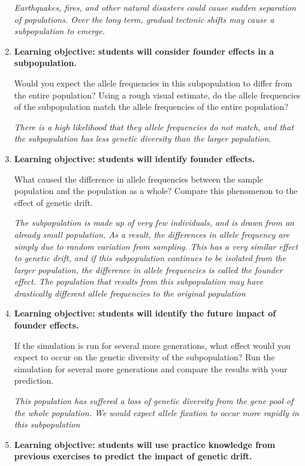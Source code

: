 \documentclass[12pt]{article}
\begin{document}
\begin{spacing}{1.5}
\begin{enumerate}
\par \textit{Earthquakes, fires, and other natural disasters could cause sudden separation of populations. Over the long term, gradual tectonic shifts may cause a subpopulation to emerge.}
\item
\par \textbf{Learning objective: students will consider founder effects in a subpopulation.}
\par Would you expect the allele frequencies in this subpopulation to differ from the entire population? Using a rough visual estimate, do the allele frequencies of the subpopulation match the allele frequencies of the entire population?
\par \textit{There is a high likelihood that they allele frequencies do not match, and that the subpopulation has less genetic diversity than the larger population.}
\item
\par \textbf{Learning objective: students will identify founder effects.}
\par What caused the difference in allele frequencies between the sample population and the population as a whole? Compare this phenomenon to the effect of genetic drift.
\par \textit{The subpopulation is made up of very few individuals, and is drawn from an already small population. As a result, the differences in allele frequency are simply due to random variation from sampling. This has a very similar effect to genetic drift, and if this subpopulation continues to be isolated from the larger population, the difference in allele frequencies is called the founder effect. The population that results from this subpopulation may have drastically different allele frequencies to the original population}
\item
\par \textbf{Learning objective: students will identify the future impact of founder effects.}
\par If the simulation is run for several more generations, what effect would you expect to occur on the genetic diversity of the subpopulation? Run the simulation for several more generations and compare the results with your prediction.
\par \textit{This population has suffered a loss of genetic diversity from the gene pool of the whole population. We would expect allele fixation to occur more rapidly in this subpopulation}
\item
\par \textbf{Learning objective: students will use practice knowledge from previous exercises to predict the impact of genetic drift.}

\end{enumerate}
\end{spacing}
\end{document}
